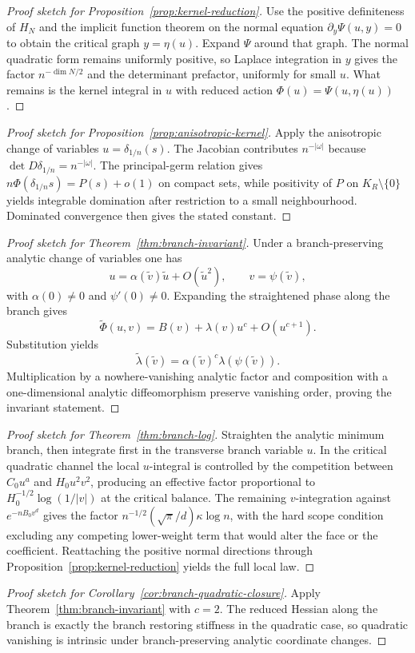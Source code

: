\documentclass[11pt,a4paper]{article}
\numberwithin{equation}{section}
\theoremstyle{thmcompact}
\theoremstyle{remark}
\begin{document}
\begin{proof}[Proof sketch for Proposition~\ref{prop:kernel-reduction}]
Use the positive definiteness of $H_N$ and the implicit function theorem on the normal equation $\partial_y\Psi(u,y)=0$ to obtain the critical graph $y=\eta(u)$. Expand $\Psi$ around that graph. The normal quadratic form remains uniformly positive, so Laplace integration in $y$ gives the factor $n^{-\dim N/2}$ and the determinant prefactor, uniformly for small $u$. What remains is the kernel integral in $u$ with reduced action $\Phi(u)=\Psi(u,\eta(u))$.
\end{proof}

\begin{proof}[Proof sketch for Proposition~\ref{prop:anisotropic-kernel}]
Apply the anisotropic change of variables $u=\delta_{1/n}(s)$. The Jacobian contributes $n^{-|\omega|}$ because $\det D\delta_{1/n}=n^{-|\omega|}$. The principal-germ relation gives $n\Phi(\delta_{1/n}s)=P(s)+o(1)$ on compact sets, while positivity of $P$ on $K_R\setminus\{0\}$ yields integrable domination after restriction to a small neighbourhood. Dominated convergence then gives the stated constant.
\end{proof}

\begin{proof}[Proof sketch for Theorem~\ref{thm:branch-invariant}]
Under a branch-preserving analytic change of variables one has
\[
 u=\alpha(\tilde v)\tilde u+O(\tilde u^2),
\qquad
v=\psi(\tilde v),
\]
with $\alpha(0)\neq 0$ and $\psi'(0)\neq 0$. Expanding the straightened phase along the branch gives
\[
\widetilde \Phi(u,v)=B(v)+\lambda(v)u^c+O(u^{c+1}).
\]
Substitution yields
\[
\widetilde \lambda(\tilde v)=\alpha(\tilde v)^c\lambda(\psi(\tilde v)).
\]
Multiplication by a nowhere-vanishing analytic factor and composition with a one-dimensional analytic diffeomorphism preserve vanishing order, proving the invariant statement.
\end{proof}

\begin{proof}[Proof sketch for Theorem~\ref{thm:branch-log}]
Straighten the analytic minimum branch, then integrate first in the transverse branch variable $u$. In the critical quadratic channel the local $u$-integral is controlled by the competition between $C_0u^a$ and $H_0u^2v^2$, producing an effective factor proportional to $H_0^{-1/2}\log(1/|v|)$ at the critical balance. The remaining $v$-integration against $e^{-nB_0v^d}$ gives the factor $n^{-1/2}(\sqrt{\pi}/d)\kappa\log n$, with the hard scope condition excluding any competing lower-weight term that would alter the face or the coefficient. Reattaching the positive normal directions through Proposition~\ref{prop:kernel-reduction} yields the full local law.
\end{proof}

\begin{proof}[Proof sketch for Corollary~\ref{cor:branch-quadratic-closure}]
Apply Theorem~\ref{thm:branch-invariant} with $c=2$. The reduced Hessian along the branch is exactly the branch restoring stiffness in the quadratic case, so quadratic vanishing is intrinsic under branch-preserving analytic coordinate changes.
\end{proof}
\end{document}
